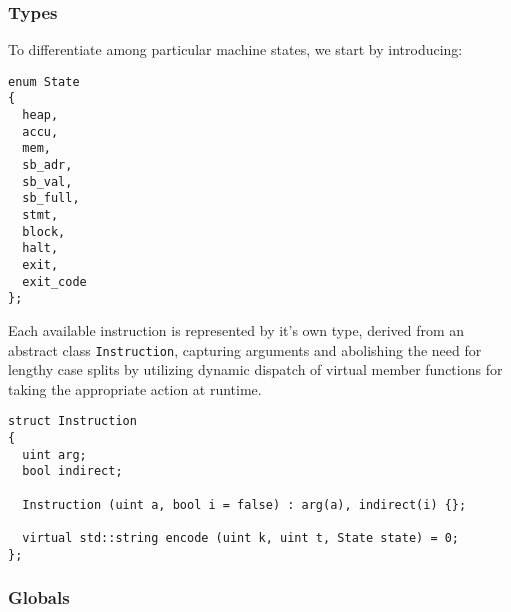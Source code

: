 \subsubsection{Types}

To differentiate among particular machine states, we start by introducing:%


\begin{lstlisting}[style=c++]
enum State
{
  heap,
  accu,
  mem,
  sb_adr,
  sb_val,
  sb_full,
  stmt,
  block,
  halt,
  exit,
  exit_code
};
\end{lstlisting}
Each available instruction is represented by it's own type, derived from an abstract class \texttt{Instruction}, capturing arguments and abolishing the need for lengthy case splits by utilizing dynamic dispatch of virtual member functions for taking the appropriate action at runtime.%
\begin{lstlisting}[style=c++]
struct Instruction
{
  uint arg;
  bool indirect;

  Instruction (uint a, bool i = false) : arg(a), indirect(i) {};

  virtual std::string encode (uint k, uint t, State state) = 0;
};
\end{lstlisting}

\subsubsection{Globals}

